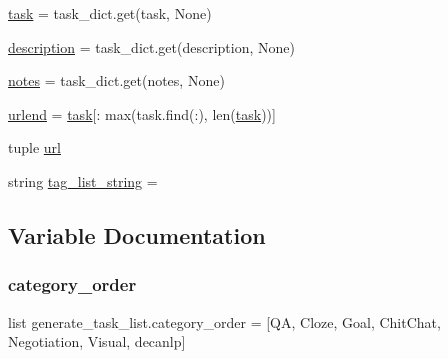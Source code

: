 \begin{DoxyCompactItemize}
\hyperlink{namespacegenerate__task__list_a6a85e730374a68f9195f2e0e4fc09a9a}{task} = task\+\_\+dict.\+get(\textquotesingle{}task\textquotesingle{}, None)
\item 
\hyperlink{namespacegenerate__task__list_af4d07327ee07ddc711991e687bfe3a0a}{description} = task\+\_\+dict.\+get(\textquotesingle{}description\textquotesingle{}, None)
\item 
\hyperlink{namespacegenerate__task__list_a1feaa5a8d61ba81c4e59ce336b9e1a95}{notes} = task\+\_\+dict.\+get(\textquotesingle{}notes\textquotesingle{}, None)
\item 
\hyperlink{namespacegenerate__task__list_a32a1426d61e9e5475d58bdb9db0d22ab}{urlend} = \hyperlink{namespacegenerate__task__list_a6a85e730374a68f9195f2e0e4fc09a9a}{task}\mbox{[}\+: max(task.\+find(\textquotesingle{}\+:\textquotesingle{}), len(\hyperlink{namespacegenerate__task__list_a6a85e730374a68f9195f2e0e4fc09a9a}{task}))\mbox{]}
\item 
tuple \hyperlink{namespacegenerate__task__list_a44c805c529a26ee211795d8c7064facb}{url}
\item 
string \hyperlink{namespacegenerate__task__list_a82101fcc5cd14207589b27749bf3bac2}{tag\+\_\+list\+\_\+string} = \textquotesingle{}\textquotesingle{}
\end{DoxyCompactItemize}


\subsection{Variable Documentation}
\mbox{\label{namespacegenerate__task__list_a7697d682f472185323fda0300e278233}} 
\subsubsection{\texorpdfstring{category\+\_\+order}{category\_order}}
{\footnotesize\ttfamily list generate\+\_\+task\+\_\+list.\+category\+\_\+order = \mbox{[}\textquotesingle{}QA\textquotesingle{}, \textquotesingle{}Cloze\textquotesingle{}, \textquotesingle{}Goal\textquotesingle{}, \textquotesingle{}Chit\+Chat\textquotesingle{}, \textquotesingle{}Negotiation\textquotesingle{}, \textquotesingle{}Visual\textquotesingle{}, \textquotesingle{}decanlp\textquotesingle{}\mbox{]}}

